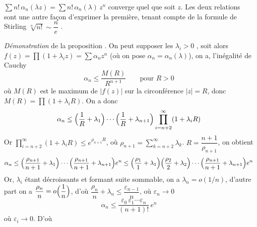 \documentclass[11pt,a4paper]{article}
\begin{document}
$\sum n!\,\alpha_n(\lambda z) = \sum n!\,\alpha_n(\lambda)\, z^n$ converge quel que soit $z$. Les deux  relations \struck{\ill{}} sont une autre façon d'exprimer la première,  tenant compte de la formule de Stirling $\sqrt[n]{n!} \sim \dfrac{n}{e}$ \ill{}.

\emph{Démonstration} de la proposition . On peut supposer les $\lambda_i > 0$ , soit alors $f(z) = \prod (1 + \lambda_i z) = \sum \alpha_n z^n$ (où on pose $\alpha_n = \alpha_n(\lambda)$), \struck{\ill{}} on a, \struck{\ill{}} l'inégalité de Cauchy
\[
  \alpha_n \leq \frac{M(R)}{R^{n+1}} \qquad \text{pour } R > 0
\]
 où $M(R)$ est le maximum de $|f(z)|$ sur la circonférence $|z| = R$, donc $M(R) = \prod (1 + \lambda_i R)$.  On a donc
\[
  \alpha_n \leq \Bigl(\frac{1}{R} + \lambda_1\Bigr) \cdots \Bigl(\frac{1}{R} + \lambda_{n+1}\Bigr) \prod_{i=n+2}^{\infty} (1 + \lambda_i R)
\]
 Or $\prod_{i=n+2}^{\infty} (1 + \lambda_i R) \leq e^{\rho_{n+1} R}$, où $\rho_{n+1} = \sum_{k=n+2}^{\infty} \lambda_k$.  $R = \dfrac{n+1}{\rho_{n+1}}$, on obtient
\[
  \alpha_n \leq \Bigl(\frac{\rho_{n+1}}{n+1} + \lambda_1\Bigr)\cdots\Bigl(\frac{\rho_{n+1}}{n+1} + \lambda_{n+1}\Bigr) e^{n} \leq \Bigl(\frac{\rho_1}{1} + \lambda_1\Bigr)\Bigl(\frac{\rho_2}{2} + \lambda_2\Bigr)\cdots\Bigl(\frac{\rho_{n+1}}{n+1} + \lambda_{n+1}\Bigr) e^{n}
\]
 Or, \struck{\ill{}}  $\lambda_i$ étant décroissants et formant suite sommable, on a $\lambda_n = o(1/n)$, d'autre part on a \struck{\ill{}} $\dfrac{\rho_n}{n} = o\Bigl(\dfrac{1}{n}\Bigr)$, d'où $\dfrac{\rho_n}{n} + \lambda_n \leq \dfrac{\varepsilon_{n-1}}{n}$, où $\varepsilon_n \to 0$
\[
  \alpha_n \leq \frac{\varepsilon_0\, \varepsilon_1 \cdots \varepsilon_{n}}{(n+1)!}\, e^{n}
\]
 où $\varepsilon_i \to 0$. D'où 
\end{document}
